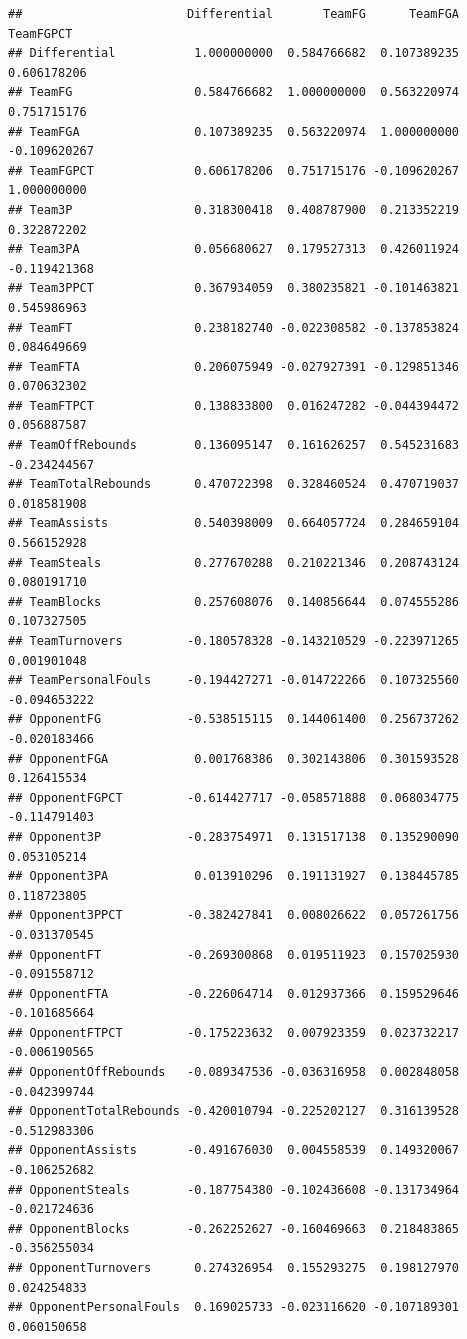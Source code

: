 \documentclass[
]{book}
\begin{document}
\begin{verbatim}
##                       Differential       TeamFG      TeamFGA    TeamFGPCT
## Differential           1.000000000  0.584766682  0.107389235  0.606178206
## TeamFG                 0.584766682  1.000000000  0.563220974  0.751715176
## TeamFGA                0.107389235  0.563220974  1.000000000 -0.109620267
## TeamFGPCT              0.606178206  0.751715176 -0.109620267  1.000000000
## Team3P                 0.318300418  0.408787900  0.213352219  0.322872202
## Team3PA                0.056680627  0.179527313  0.426011924 -0.119421368
## Team3PPCT              0.367934059  0.380235821 -0.101463821  0.545986963
## TeamFT                 0.238182740 -0.022308582 -0.137853824  0.084649669
## TeamFTA                0.206075949 -0.027927391 -0.129851346  0.070632302
## TeamFTPCT              0.138833800  0.016247282 -0.044394472  0.056887587
## TeamOffRebounds        0.136095147  0.161626257  0.545231683 -0.234244567
## TeamTotalRebounds      0.470722398  0.328460524  0.470719037  0.018581908
## TeamAssists            0.540398009  0.664057724  0.284659104  0.566152928
## TeamSteals             0.277670288  0.210221346  0.208743124  0.080191710
## TeamBlocks             0.257608076  0.140856644  0.074555286  0.107327505
## TeamTurnovers         -0.180578328 -0.143210529 -0.223971265  0.001901048
## TeamPersonalFouls     -0.194427271 -0.014722266  0.107325560 -0.094653222
## OpponentFG            -0.538515115  0.144061400  0.256737262 -0.020183466
## OpponentFGA            0.001768386  0.302143806  0.301593528  0.126415534
## OpponentFGPCT         -0.614427717 -0.058571888  0.068034775 -0.114791403
## Opponent3P            -0.283754971  0.131517138  0.135290090  0.053105214
## Opponent3PA            0.013910296  0.191131927  0.138445785  0.118723805
## Opponent3PPCT         -0.382427841  0.008026622  0.057261756 -0.031370545
## OpponentFT            -0.269300868  0.019511923  0.157025930 -0.091558712
## OpponentFTA           -0.226064714  0.012937366  0.159529646 -0.101685664
## OpponentFTPCT         -0.175223632  0.007923359  0.023732217 -0.006190565
## OpponentOffRebounds   -0.089347536 -0.036316958  0.002848058 -0.042399744
## OpponentTotalRebounds -0.420010794 -0.225202127  0.316139528 -0.512983306
## OpponentAssists       -0.491676030  0.004558539  0.149320067 -0.106252682
## OpponentSteals        -0.187754380 -0.102436608 -0.131734964 -0.021724636
## OpponentBlocks        -0.262252627 -0.160469663  0.218483865 -0.356255034
## OpponentTurnovers      0.274326954  0.155293275  0.198127970  0.024254833
## OpponentPersonalFouls  0.169025733 -0.023116620 -0.107189301  0.060150658

\end{verbatim}
\end{document}
